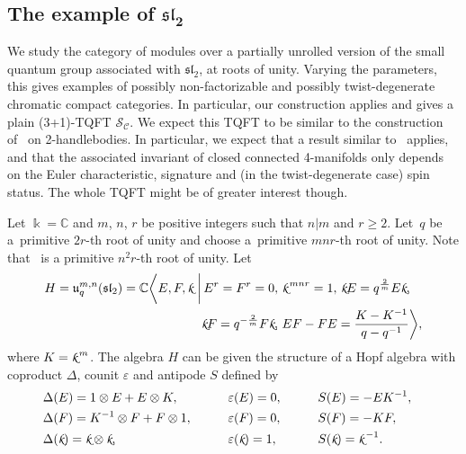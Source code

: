 \documentclass[pdftex]{sigma}
\numberwithin{equation}{section}
\newcommand{\smk}{{\fontfamily{pzc}\selectfont \text{k}}}
\numberwithin{theorem}{section}
\numberwithin{proposition}{section}
\numberwithin{definition}{section}
\numberwithin{lemma}{section}
\numberwithin{corollary}{section}
\numberwithin{remark}{section}
\numberwithin{example}{section}
\newcommand{\cat}{\mathcal{C}}
\newcommand{\C}{\ensuremath{\mathbb{C}}}
\newcommand{\FK}{{\Bbbk}}
\newcommand{\TSkein}{{\mathscr{S}}}
\begin{document}
\subsection[The example of sl\_2]{The example of $\boldsymbol{\mathfrak{sl}_2}$}\label{SS:Ex-sl2}
We study the category of modules over a partially unrolled version of
the small quantum group associated with $\mathfrak{sl}_2$, at roots of
unity. Varying the parameters, this gives examples of possibly
non-factorizable and possibly twist-degenerate chromatic compact
categories. In particular, our construction applies and gives a plain
(3+1)-TQFT $\TSkein_\cat$. We expect this TQFT to be similar to the
construction of~\cite[Section 9.2]{BD21} on 2-handlebodies. In
particular, we expect that a result similar to~\cite[Theorem
8.1]{BD22} applies, and that the associated invariant of closed
connected 4-manifolds only depends on the Euler characteristic,
signature and (in the twist-degenerate case) spin status. The whole
TQFT might be of greater interest though.
\newcommand{\pp}{r}
\begin{definition}
 Let $\FK=\C$ and $m$, $n$, $r$ be positive integers such that $n\vert m$
 and $r\ge2$.
 Let~$q$ be a~primitive $2r$-th
 root of unity and choose  a~primitive $mn{\pp}$-th root
 of unity. Note that~
 is a primitive
 $n^2{\pp}$-th root of unity. Let
 \begin{align*}
 &H=\mathfrak{u}^{m,n}_{q}(\mathfrak{sl}_2)
 = \C\biggl\langle E,F,{\smk} \ \bigg|\,
 E^{{\pp}}=F^{{\pp}}=0,\, \smk^{\,mn{\pp}}=1, \,\smk E=q^\frac{2}{m}E\smk, \\
& \hphantom{H=\mathfrak{u}^{m,n}_{q}(\mathfrak{sl}_2)
 = \C\biggl\langle E,F,\smk \,\bigg|\, }{}
 \smk
 F=q^{-\frac{2}{m}}F\smk,\, EF-FE=\frac{K-K^{-1}}{q-q^{-1}} \biggr\rangle,
 \end{align*}
 where $K=\smk^{\, m}$.
 The algebra $H$ can be given the structure of a Hopf algebra with coproduct $\Delta$, counit $\varepsilon$ and antipode $S$ defined by
\begin{alignat*}{4}
&\Delta(E)=1\otimes E + E \otimes K,\qquad && \varepsilon(E)=0,\qquad && S(E)= -EK^{-1},&\\
&\Delta(F)= K^{-1}\otimes F+F\otimes 1,\qquad && \varepsilon(F)=0,\qquad && S(F)=-KF,&\\
&\Delta(\smk)= \smk\otimes \smk,\qquad && \varepsilon(\smk)=1,\qquad && S(\smk)=\smk^{\,-1}.&
 \end{alignat*}
 \end{definition}
\end{document}
